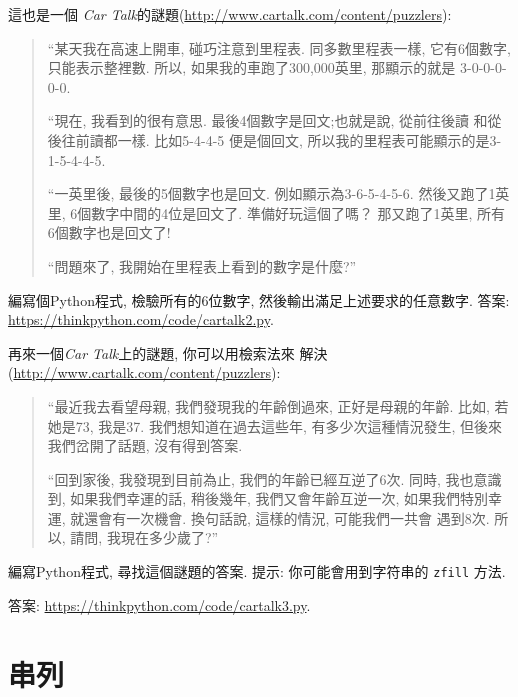 \documentclass[10pt]{book}
\begin{document}
\begin{exercise}
這也是一個 {\em Car Talk}的謎題(\url{http://www.cartalk.com/content/puzzlers}):

\begin{quote}

``某天我在高速上開車, 碰巧注意到里程表. 
同多數里程表一樣, 它有6個數字, 只能表示整裡數. 
所以, 如果我的車跑了300,000英里, 那顯示的就是
3-0-0-0-0-0.

``現在, 我看到的很有意思. 最後4個數字是回文;也就是說, 從前往後讀
和從後往前讀都一樣. 比如5-4-4-5 便是個回文, 
所以我的里程表可能顯示的是3-1-5-4-4-5.

``一英里後, 最後的5個數字也是回文. 
例如顯示為3-6-5-4-5-6. 然後又跑了1英里, 6個數字中間的4位是回文了. 
準備好玩這個了嗎？ 那又跑了1英里, 所有6個數字也是回文了!

``問題來了, 我開始在里程表上看到的數字是什麼?''
\end{quote}

編寫個Python程式, 檢驗所有的6位數字, 然後輸出滿足上述要求的任意數字. 
答案: \url{https://thinkpython.com/code/cartalk2.py}.

\end{exercise}


\begin{exercise}
再來一個{\em Car Talk}上的謎題, 你可以用檢索法來
解決(\url{http://www.cartalk.com/content/puzzlers}):

\begin{quote}
``最近我去看望母親, 我們發現我的年齡倒過來, 正好是母親的年齡. 
比如, 若她是73, 我是37. 我們想知道在過去這些年, 有多少次這種情況發生, 
但後來我們岔開了話題, 沒有得到答案. 

``回到家後, 我發現到目前為止, 我們的年齡已經互逆了6次. 
同時, 我也意識到, 如果我們幸運的話, 稍後幾年, 我們又會年齡互逆一次, 
如果我們特別幸運, 就還會有一次機會. 換句話說, 這樣的情況, 可能我們一共會
遇到8次. 所以, 請問, 我現在多少歲了?''

\end{quote}

編寫Python程式, 尋找這個謎題的答案. 
提示: 你可能會用到字符串的 {\tt zfill} 方法. 

答案: \url{https://thinkpython.com/code/cartalk3.py}.

\end{exercise}



\chapter{串列}
\end{document}
